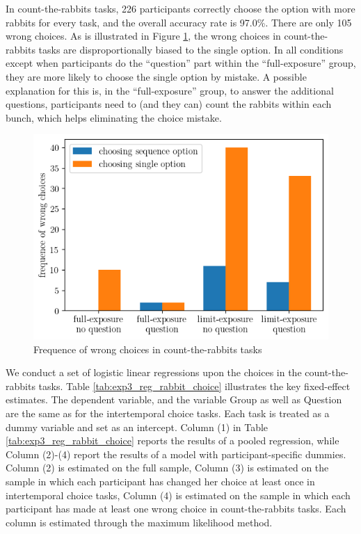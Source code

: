\documentclass[
  12pt,
]{article}
\begin{document}
In count-the-rabbits tasks, 226 participants correctly choose the option
with more rabbits for every task, and the overall accuracy rate is
97.0\%. There are only 105 wrong choices. As is illustrated in Figure
\ref{fig:exp3_wrong_rabbits}, the wrong choices in count-the-rabbits
tasks are disproportionally biased to the single option. In all
conditions except when participants do the ``question'' part within the
``full-exposure'' group, they are more likely to choose the single
option by mistake. A possible explanation for this is, in the
``full-exposure'' group, to answer the additional questions,
participants need to (and they can) count the rabbits within each bunch,
which helps eliminating the choice mistake.

\begin{figure}
  \centering
  \includegraphics[width=0.7\linewidth]{figures/exp3_wrong_rabbit_choice.png}
  \caption{Frequence of wrong choices in count-the-rabbits tasks}
  \label{fig:exp3_wrong_rabbits}
\end{figure}

We conduct a set of logistic linear regressions upon the choices in the
count-the-rabbits tasks. Table \ref{tab:exp3_reg_rabbit_choice}
illustrates the key fixed-effect estimates. The dependent variable, and
the variable Group as well as Question are the same as for the
intertemporal choice tasks. Each task is treated as a dummy variable and
set as an intercept. Column (1) in Table
\ref{tab:exp3_reg_rabbit_choice} reports the results of a pooled
regression, while Column (2)-(4) report the results of a model with
participant-specific dummies. Column (2) is estimated on the full
sample, Column (3) is estimated on the sample in which each participant
has changed her choice at least once in intertemporal choice tasks,
Column (4) is estimated on the sample in which each participant has made
at least one wrong choice in count-the-rabbits tasks. Each column is
estimated through the maximum likelihood method.
\end{document}
